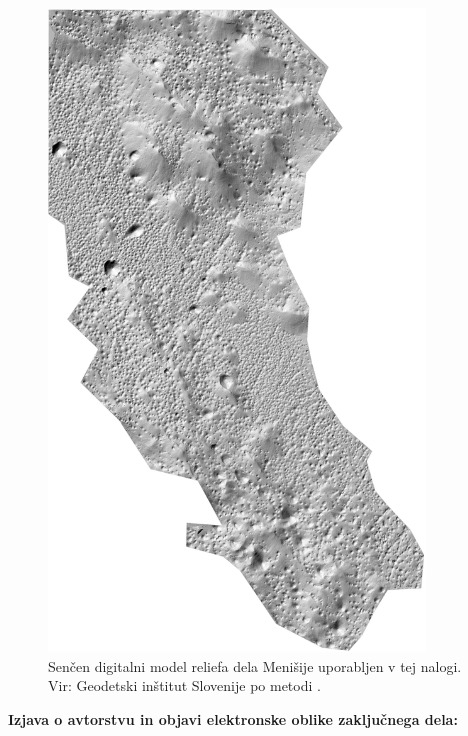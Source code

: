 \documentclass[a4paper, twoside, 12pt]{book}
\begin{document}
 \begin{figure}[H]
    \begin{center}
      \includegraphics[width=10cm]{slike/menisija-relief}
    \end{center}
    \caption{Senčen digitalni model reliefa dela Menišije uporabljen v tej nalogi. Vir: Geodetski inštitut Slovenije \cite{LAK} po metodi \cite{Kobler20079}.}
    \label{fig:menisija-relief}
  \end{figure}


    \newpage \thispagestyle{empty}


    \nocite{*}
    \newpage
    {}
    

    \newpage \thispagestyle{empty}



    \vspace*{1cm}
    \begin{center} {\Large \textbf{\sc Izjava o avtorstvu in objavi elektronske oblike zaključnega dela: }} \end{center}
\end{document}
